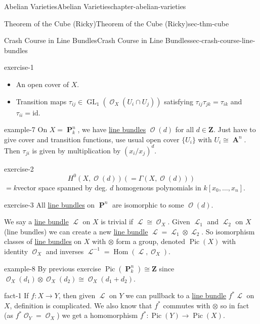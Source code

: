 \documentclass[oneside,10pt,]{book}
\numberwithin{equation}{section}
\newcommand{\sheaf}[1]{\operatorname{\mathcal{#1}}}
\newcommand{\ZZ}{\mathbf{Z}}
\newcommand{\id}{\mathrm{id}}
\DeclareMathOperator{\Hom}{Hom}
\DeclareMathOperator{\Pic}{Pic}
\DeclareMathOperator{\aff}{\mathbf{A}}
\DeclareMathOperator{\PP}{\mathbf{P}}
\DeclareMathOperator{\GL}{GL}
\begin{document}
\begin{chapterptx}{Abelian Varieties}{}{Abelian Varieties}{}{}{chapter-abelian-varieties}
\begin{sectionptx}{Theorem of the Cube (Ricky)}{}{Theorem of the Cube (Ricky)}{}{}{sec-thm-cube}
\begin{subsectionptx}{Crash Course in Line Bundles}{}{Crash Course in Line Bundles}{}{}{sec-crash-course-line-bundles}
\begin{inlineexercise}{}{exercise-1}
\begin{itemize}[label=\textbullet]
\item{}An open cover of \(X\).%
\item{}Transition maps \(\tau_{ij} \in \GL_1(\sheaf O_X(U_i\cap U_j))\) satisfying \(\tau_{ij}\tau_{jk} =\tau_{ik}\) and \(\tau_{ii} = \id\).%
\end{itemize}
%
\end{inlineexercise}
\begin{example}{}{example-7}%
\hypertarget{p-112}{}%
On \(X = \PP^n_k\), we have \hyperref[def-line-bundle]{line bundles} \(\sheaf O(d)\) for all \(d\in \ZZ\). Just have to give cover and transition functions, use usual open cover \(\{U_i\}\) with \(U_i\cong \aff^n\). Then \(\tau_{ji}\) is given by multiplication by \((x_i/x_j)^d\).%
\end{example}
\begin{inlineexercise}{}{exercise-2}%
\hypertarget{p-113}{}%
%
\begin{equation*}
H^0(X,\sheaf O(d)) ( = \Gamma (X,\sheaf O(d)))
\end{equation*}
\(= k\)vector space spanned by deg. \(d\) homogenous polynomials  in \(k[x_0,\ldots, x_n]\).%
\end{inlineexercise}
\begin{inlineexercise}{}{exercise-3}%
\hypertarget{p-114}{}%
All \hyperref[def-line-bundle]{line bundles} on \(\PP^n\) are isomorphic to some \(\sheaf O(d)\).%
\end{inlineexercise}
\hypertarget{p-115}{}%
We say a \hyperref[def-line-bundle]{line bundle} \(\sheaf L\) on \(X\) is trivial if \(\sheaf L \cong \sheaf O_X\). Given \(\sheaf L_1\) and \(\sheaf L_2\) on \(X\) (line bundles) we can create a new \hyperref[def-line-bundle]{line bundle} \(\sheaf L = \sheaf L_1 \otimes \sheaf L_2\). So isomorphism classes of \hyperref[def-line-bundle]{line bundles} on \(X\) with \(\otimes\) form a group, denoted \(\Pic(X)\) with identity \(\sheaf O_X\) and inverses \(\sheaf L^{-1} = \Hom(\sheaf L , \sheaf O_X)\).%
\begin{example}{}{example-8}%
\hypertarget{p-116}{}%
By previous exercise \(\Pic(\PP_k^n) \cong \ZZ\) since \(\sheaf O_X(d_1) \otimes \sheaf O_X(d_2)  \cong \sheaf O_X(d_1+d_2)\).%
\end{example}
\begin{fact}{}{}{fact-1}%
\hypertarget{p-117}{}%
If \(f\colon X \to Y\), then given \(\sheaf L\) on \(Y\) we can pullback to a \hyperref[def-line-bundle]{line bundle} \(f^* \sheaf L\) on \(X\), definition is complicated. We also know that \(f^*\) commutes with \(\otimes\) so in fact (as \(f^*\sheaf O_Y = \sheaf O_X\)) we get a homomorphism \(f^* \colon \Pic(Y) \to \Pic(X)\).%

\end{fact}
\end{subsectionptx}
\end{sectionptx}
\end{chapterptx}
\end{document}
